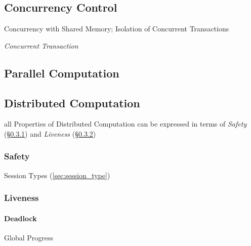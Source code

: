 \subsection{Concurrency Control}\label{sec:concurrency_control}

Concurrency with Shared Memory; Isolation of Concurrent Transactions

\emph{Concurrent Transaction}



\subsection{Parallel Computation}\label{sec:parallel_computation}

\subsection{Distributed Computation}\label{sec:distributed_computation}

all Properties of Distributed Computation can be expressed in terms of
\emph{Safety} (\S\ref{sec:safety}) and \emph{Liveness}
(\S\ref{sec:liveness})



\subsubsection{Safety}\label{sec:safety}

\fist Session Types (\ref{sec:session_type})



\subsubsection{Liveness}\label{sec:liveness}

\paragraph{Deadlock}\label{sec:deadlock}\hfill

Global Progress



